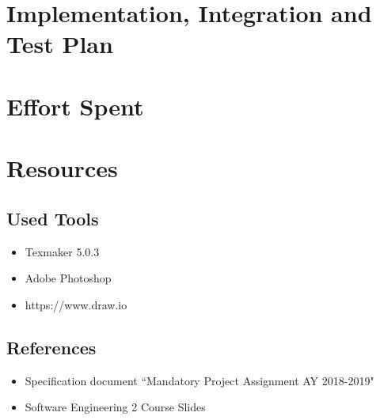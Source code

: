 \documentclass{article}
\begin{document}
\section{Implementation, Integration and Test Plan}
\newpage
\section{Effort Spent}
\section{Resources}
\subsection{Used Tools}
\begin{itemize}
\item Texmaker 5.0.3
\item Adobe Photoshop
\item https://www.draw.io
\end{itemize}
\subsection{References}
\begin{itemize}
\item Specification document “Mandatory Project Assignment AY 2018-2019"
\item Software Engineering 2 Course Slides
\end{itemize}
\newpage
\end{document}
